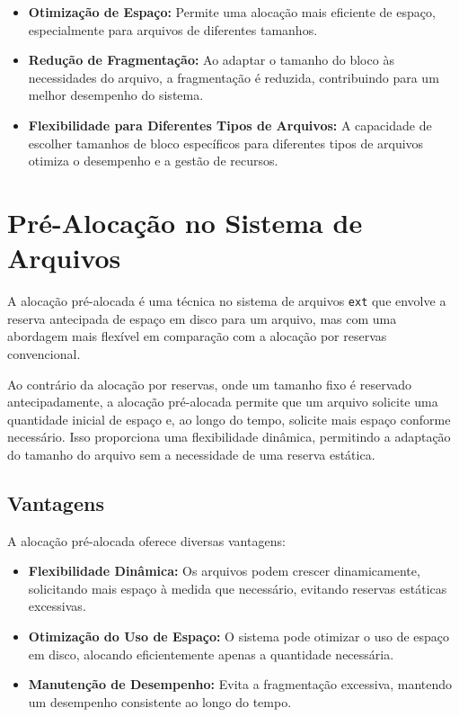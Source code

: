 \documentclass[
	12pt,				%
	openright,			%
	oneside,			%
	a4paper,			%
	chapter=TITLE,		%
	english,			%
	french,				%
	spanish,			%
	brazil				%
	]{abntex2}
\theoremstyle{definition}
\begin{document}
\begin{itemize}
    \item \textbf{Otimização de Espaço:} Permite uma alocação mais eficiente de espaço, especialmente para arquivos de diferentes tamanhos.
    
    \item \textbf{Redução de Fragmentação:} Ao adaptar o tamanho do bloco às necessidades do arquivo, a fragmentação é reduzida, contribuindo para um melhor desempenho do sistema.
    
    \item \textbf{Flexibilidade para Diferentes Tipos de Arquivos:} A capacidade de escolher tamanhos de bloco específicos para diferentes tipos de arquivos otimiza o desempenho e a gestão de recursos.
\end{itemize}

\section{Pré-Alocação no Sistema de Arquivos}
A alocação pré-alocada é uma técnica no sistema de arquivos \texttt{ext} que envolve a reserva antecipada de espaço em disco para um arquivo, mas com uma abordagem mais flexível em comparação com a alocação por reservas convencional.

Ao contrário da alocação por reservas, onde um tamanho fixo é reservado antecipadamente, a alocação pré-alocada permite que um arquivo solicite uma quantidade inicial de espaço e, ao longo do tempo, solicite mais espaço conforme necessário. Isso proporciona uma flexibilidade dinâmica, permitindo a adaptação do tamanho do arquivo sem a necessidade de uma reserva estática.

\subsection{Vantagens}
A alocação pré-alocada oferece diversas vantagens:

\begin{itemize}
    \item \textbf{Flexibilidade Dinâmica:} Os arquivos podem crescer dinamicamente, solicitando mais espaço à medida que necessário, evitando reservas estáticas excessivas.
    
    \item \textbf{Otimização do Uso de Espaço:} O sistema pode otimizar o uso de espaço em disco, alocando eficientemente apenas a quantidade necessária.
    
    \item \textbf{Manutenção de Desempenho:} Evita a fragmentação excessiva, mantendo um desempenho consistente ao longo do tempo.
\end{itemize}
\end{document}
